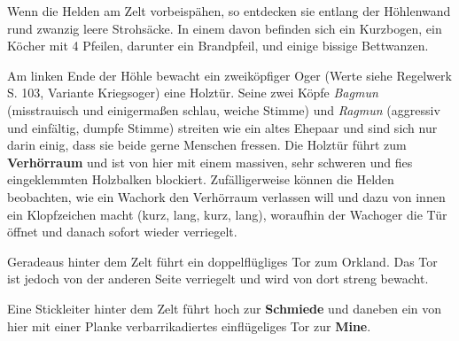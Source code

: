 
Wenn die Helden am Zelt vorbeispähen, so entdecken sie entlang der Höhlenwand rund zwanzig leere Strohsäcke. In einem davon befinden sich ein Kurzbogen, ein Köcher mit 4 Pfeilen, darunter ein Brandpfeil, und einige bissige Bettwanzen.

Am linken Ende der Höhle bewacht ein zweiköpfiger Oger (Werte siehe Regelwerk S. 103, Variante Kriegsoger) eine Holztür. Seine zwei Köpfe \textit{Bagmun} (misstrauisch und einigermaßen schlau, weiche Stimme) und \textit{Ragmun} (aggressiv und einfältig, dumpfe Stimme) streiten wie ein altes Ehepaar und sind sich nur darin einig, dass sie beide gerne Menschen fressen. Die Holztür führt zum \textbf{Verhörraum} und ist von hier mit einem massiven, sehr schweren und fies eingeklemmten Holzbalken blockiert. Zufälligerweise können die Helden beobachten, wie ein Wachork den Verhörraum verlassen will und dazu von innen ein Klopfzeichen macht (kurz, lang, kurz, lang), woraufhin der Wachoger die Tür öffnet und danach sofort wieder verriegelt.


Geradeaus hinter dem Zelt führt ein doppelflügliges Tor zum Orkland. Das Tor ist jedoch von der anderen Seite verriegelt und wird von dort streng bewacht.

Eine Stickleiter hinter dem Zelt führt hoch zur \textbf{Schmiede} und daneben ein von hier mit einer Planke verbarrikadiertes einflügeliges Tor zur \textbf{Mine}.




